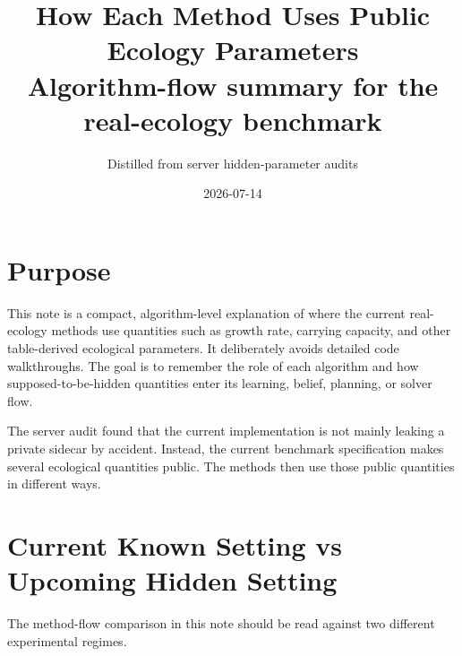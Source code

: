 \documentclass[11pt]{article}
\title{\textbf{How Each Method Uses Public Ecology Parameters}\\
\large Algorithm-flow summary for the real-ecology benchmark}
\author{Distilled from server hidden-parameter audits}
\date{2026-07-14}
\begin{document}
\maketitle

\section{Purpose}

This note is a compact, algorithm-level explanation of where the current
real-ecology methods use quantities such as growth rate, carrying capacity, and
other table-derived ecological parameters. It deliberately avoids detailed code
walkthroughs. The goal is to remember the role of each algorithm and how
supposed-to-be-hidden quantities enter its learning, belief, planning, or solver
flow.

The server audit found that the current implementation is not mainly leaking a
private sidecar by accident. Instead, the current benchmark specification makes
several ecological quantities public. The methods then use those public
quantities in different ways.

\section{Current Known Setting vs Upcoming Hidden Setting}

The method-flow comparison in this note should be read against two different
experimental regimes.
\end{document}
